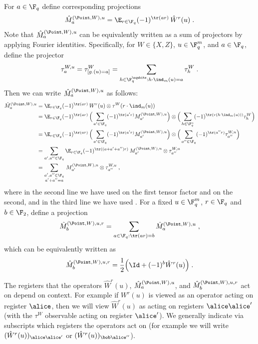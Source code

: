 For $a\in \F_q$ define corresponding projections
\[
	\hat{M}^{(\Point,W),u}_a = \E_{r \in \F_q} (-1)^{\tr(ar)} \, \hat{W}^r(u)\;.
\]
Note that $\hat{M}^{(\Point,W),u}_a$ can be equivalently
written as a sum of projectors by applying Fourier
identities. Specifically, for $W \in \{X, Z\}$, $u \in \F_q^{m}$, and
$a \in \F_q$, define the projector
\begin{equation} \tau^{W, u}_{a} =
  \tau^{W}_{[ g_{\cdot}(u) = a]} = \sum_{h \in \F_q^{\nqubits}: h
    \cdot \ind_m(u) = a} \tau^{W}_{h}\;. \label{eq:qld-point-obs-def} \end{equation}
Then we can write $\hat{M}^{(\Point, W), u}_a$ as follows:
\begin{align*}
  \hat{M}^{(\Point,W),u}_a
  &= \E_{r \in \F_q} (-1)^{\tr(ar)} \,
    W^r(u) \otimes \tau^W(r
    \cdot \ind_m(u)) \\
    &= \E_{r \in \F_q}
    (-1)^{\tr(ar)} \, \Big(\sum_{a' \in \F_q}(-1)^{\tr (a' r)} M^{(\Point,W),u}_{a'}
    \Big) \otimes \Big(
    \sum_{h \in \F_q^n}
    (-1)^{\tr( r( h \cdot \ind_m(u)))} \tau^{W}_{h} \Big) \\
  &= \E_{r \in \F_q}
    (-1)^{\tr(ar)} \, \Big(\sum_{a' \in \F_q}(-1)^{\tr (a' r)} M^{(\Point,W),u}_{a'}
    \Big) \otimes \Big(
    \sum_{a'' \in \F_q}
    (-1)^{\tr(a'' r)} \tau^{W,u}_{a''} \Big) \\
  &=	\sum_{a',a'' \in \F_q} \E_{r \in \F_q} (-1)^{\tr((a + a' + a'')r)} \, M^{(\Point,W),u}_{a'}  \otimes \tau^{W,u}_{a''} \\
  &= \sum_{\substack{a',a'' \in \F_q \\ a' + a'' = a}}  \, M^{(\Point,W),u}_{a'}  \otimes \tau^{W,u}_{a''}\;,
\end{align*}
where in the second line we have used  on the
first tensor factor and  on the second, and in the third line we
have used .
For a fixed $u\in\F_q^m$, $r \in \F_q$ and $b \in \F_2$, define a projection
\begin{equation}
	\hat{M}^{(\Point,W),u,r}_b = \sum_{a \in \F_q : \tr(ar) = b}
        \hat{M}^{(\Point,W),u}_a\;, \label{eq:qld-def-mptur}
\end{equation}
which can be equivalently written as
\begin{equation}\label{eq:lc-22}
\hat{M}^{(\Point,W),u,r}_b = \frac{1}{2} \Big ( \Id + (-1)^b \hat{W}^r(u) \Big)\;.
\end{equation}

The registers that the operators $\hat{W}^r(u)$,
$\hat{M}^{(\Point,W),u}_a$, and $\hat{M}^{(\Point,W),u,r}_b$ act on
depend on context. For example if $W^r(u)$ is viewed as an operator
acting on register $\alice$, then we will view $\hat{W}^r(u)$ as
acting on registers $\alice \alice'$ (with the $\tau^W$ observable
acting on register $\alice'$). We generally indicate via subscripts
which registers the operators act on (for example we will write
$(\hat{W}^r(u))_{\alice \alice'}$ or $(\hat{W}^r(u))_{\bob
  \alice''}$).




